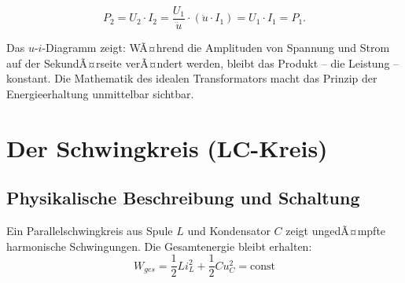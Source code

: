 ﻿\documentclass[12pt, a4paper]{article}
\begin{document}
	\begin{equation}
		P_2 = U_2 \cdot I_2 = \frac{U_1}{\ddot{u}} \cdot (\ddot{u} \cdot I_1) = U_1 \cdot I_1 = P_1.
	\end{equation}
	
	Das $u$-$i$-Diagramm zeigt: WÃ¤hrend die Amplituden von Spannung und Strom auf der SekundÃ¤rseite verÃ¤ndert werden, bleibt das Produkt -- die Leistung -- konstant. Die Mathematik des idealen Transformators macht das Prinzip der Energieerhaltung unmittelbar sichtbar.
	
	\section{Der Schwingkreis (LC-Kreis)}
	
	\subsection{Physikalische Beschreibung und Schaltung}
	
	Ein Parallelschwingkreis aus Spule $L$ und Kondensator $C$ zeigt ungedÃ¤mpfte harmonische Schwingungen. Die Gesamtenergie bleibt erhalten:
	\begin{equation}
		W_{ges} = \frac{1}{2}L i_L^2 + \frac{1}{2}C u_C^2 = \text{const}
	\end{equation}
	
\end{document}
